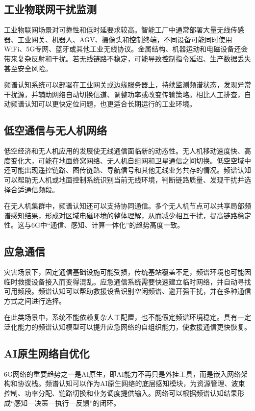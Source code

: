 \documentclass[UTF8,fontset=windows,zihao=-4]{ctexart}
\begin{document}
\subsection{工业物联网干扰监测}
工业物联网场景对可靠性和低时延要求较高。智能工厂中通常部署大量无线传感器、工业网关、机器人、AGV、摄像头和控制终端，不同设备可能同时使用WiFi、5G专网、蓝牙或其他工业无线协议。金属结构、机器运动和电磁设备还会带来复杂反射和干扰。若无线链路不稳定，可能导致控制指令延迟、生产数据丢失甚至安全风险。

频谱认知系统可以部署在工业网关或边缘服务器上，持续监测频谱状态，发现异常干扰源，并辅助网络自动切换信道、调整功率或改变传输策略。相比人工排查，自动频谱认知可以更快定位问题，也更适合长期运行的工业环境。

\subsection{低空通信与无人机网络}
低空经济和无人机应用的发展使无线通信面临新的动态性。无人机移动速度快、高度变化大，可能在地面蜂窝网络、无人机自组网和卫星通信之间切换。低空空域中还可能出现遥控链路、图传链路、导航信号和其他无线业务共存的情况。频谱认知可以帮助无人机或地面控制系统识别当前无线环境，判断链路质量、发现干扰并选择合适通信频段。

在无人机集群中，频谱认知还可以支持协同通信。多个无人机节点可以共享局部频谱感知结果，形成对区域电磁环境的整体理解，从而减少相互干扰，提高链路稳定性。这与6G中“通信、感知、计算一体化”的趋势高度一致。

\subsection{应急通信}
灾害场景下，固定通信基础设施可能受损，传统基站覆盖不足，频谱环境也可能因临时救援设备接入而变得混乱。应急通信系统需要快速建立临时网络，并自动寻找可用频段。频谱认知可以帮助救援设备识别空闲频谱、避开强干扰，并在多种通信方式之间进行选择。

在此类场景中，系统不能依赖复杂人工配置，也不能假定频谱环境稳定。具有一定泛化能力的频谱认知模型可以提升应急网络的自组织能力，使救援通信更快恢复。

\subsection{AI原生网络自优化}
6G网络的重要趋势之一是AI原生，即AI能力不再只是外挂工具，而是嵌入网络架构和协议栈。频谱认知可以作为AI原生网络的底层感知模块，为资源管理、波束控制、功率分配、链路切换和业务调度提供输入。网络可以根据频谱认知结果形成“感知—决策—执行—反馈”的闭环。
\end{document}

